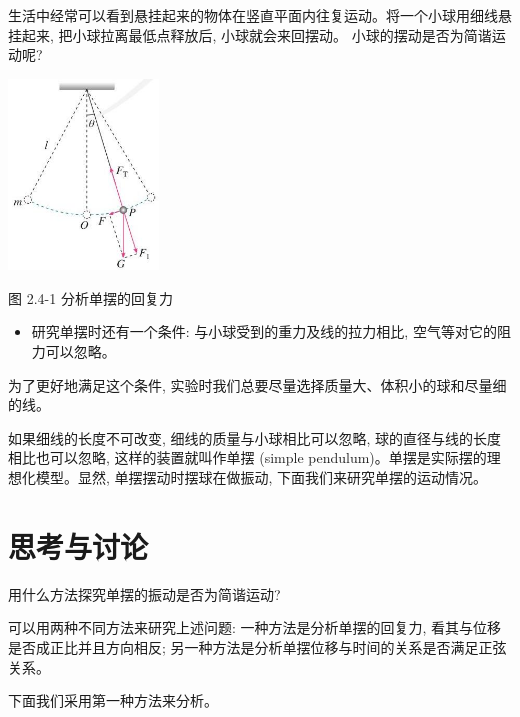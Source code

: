 \documentclass[10pt]{article}
\begin{document}
生活中经常可以看到悬挂起来的物体在竖直平面内往复运动。将一个小球用细线悬挂起来, 把小球拉离最低点释放后, 小球就会来回摆动。 小球的摆动是否为简谐运动呢?

\begin{mdframed}

\begin{center}
\includegraphics[max width=0.3\textwidth]{images/01910e4c-ebb8-7d2c-8f2f-2375bc1d2d12_51_563239.jpg}
\end{center}

图 2.4-1 分析单摆的回复力

\end{mdframed}

\begin{mdframed}

\begin{itemize}
\item 研究单摆时还有一个条件: 与小球受到的重力及线的拉力相比, 空气等对它的阻力可以忽略。
\end{itemize}

为了更好地满足这个条件, 实验时我们总要尽量选择质量大、体积小的球和尽量细的线。

\end{mdframed}

如果细线的长度不可改变, 细线的质量与小球相比可以忽略, 球的直径与线的长度相比也可以忽略, 这样的装置就叫作单摆 (simple pendulum)。单摆是实际摆的理想化模型。显然, 单摆摆动时摆球在做振动, 下面我们来研究单摆的运动情况。

\section*{思考与讨论}

用什么方法探究单摆的振动是否为简谐运动?

可以用两种不同方法来研究上述问题: 一种方法是分析单摆的回复力, 看其与位移是否成正比并且方向相反; 另一种方法是分析单摆位移与时间的关系是否满足正弦关系。

下面我们采用第一种方法来分析。
\end{document}
